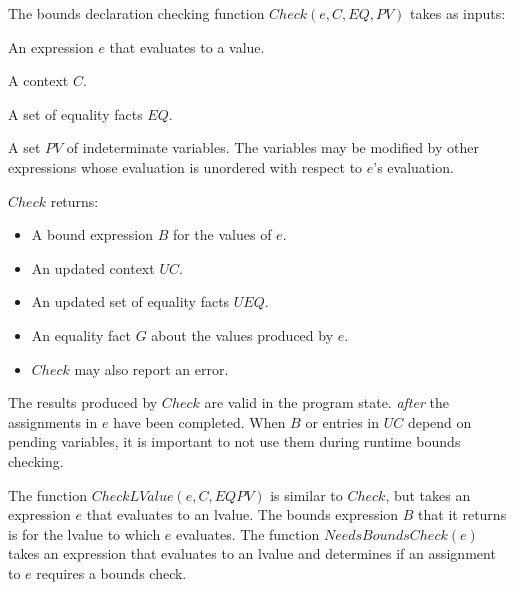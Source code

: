 The bounds declaration checking function $Check(e, C, EQ, PV)$   takes as inputs:
\begin{compactenum}
\item An expression $e$ that evaluates to a value.
\item A context $C$.
\item A set of equality facts $EQ$.
\item A set $PV$ of  indeterminate variables.  The variables 
may be modified by other expressions whose  evaluation is unordered with respect to $e$'s evaluation.
\end{compactenum}

$Check$ returns:
\begin{itemize}
\item A bound expression $B$ for the values of $e$.
\item An updated context $UC$.
\item An updated set of equality facts $UEQ$.
\item An equality fact $G$ about the values produced by $e$. 
\item $Check$ may also report an error.
\end{itemize}
The results produced by $Check$ are valid in the program state.
{\em after} the assignments in $e$ have been completed.   When $B$ or entries in 
$UC$ depend on pending variables, it is important to not use them during runtime bounds checking.

The function $CheckLValue(e, C, EQ PV)$ is similar to $Check$, but takes an
expression $e$ that evaluates to an lvalue.  The bounds expression $B$ that it 
returns is for the lvalue to which $e$ evaluates.  The function $NeedsBoundsCheck(e)$ takes
an expression that evaluates to an lvalue and determines if an 
assignment to $e$ requires a bounds check.

